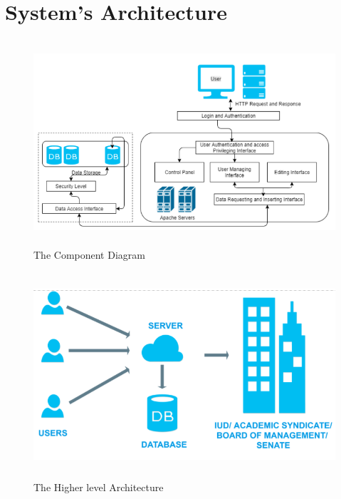 \documentclass[a4paper,beamer]{article}
\begin{document}
	\newpage
	
	\section{System's Architecture}
	\begin{figure}[h!]
		\begin{center}
			\includegraphics[width=6in,height=3in]{img/component-diagram}
		\end{center}
		\caption{The Component Diagram}
		\label{fig:component}
	\end{figure}
	\vspace{2cm}
	
	\begin{figure}[h]
		\begin{center}
			\includegraphics[width=5in,height=3in]{img/higher-level-architecture}
		\end{center}
		\caption{The Higher level Architecture}
		\label{fig:architecture}
	\end{figure}
	\vspace{2cm}
\end{document}
